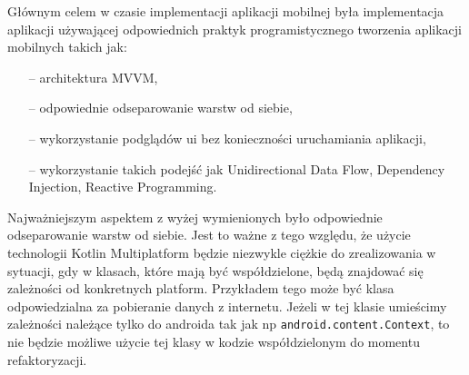 Głównym celem w czasie implementacji aplikacji mobilnej była implementacja aplikacji używającej odpowiednich praktyk programistycznego tworzenia aplikacji mobilnych takich jak:
\begin{itemize}
    \item[--] architektura MVVM,
    \item[--] odpowiednie odseparowanie warstw od siebie,
    \item[--] wykorzystanie podglądów ui bez konieczności uruchamiania aplikacji,
    \item[--] wykorzystanie takich podejść jak Unidirectional Data Flow, Dependency Injection, Reactive Programming.
\end{itemize}
Najważniejszym aspektem z wyżej wymienionych było odpowiednie odseparowanie warstw od siebie.
Jest to ważne z tego względu, że użycie technologii Kotlin Multiplatform będzie niezwykle ciężkie do zrealizowania w sytuacji, gdy w klasach, które mają być współdzielone, będą znajdować się zależności od konkretnych platform.
Przykładem tego może być klasa odpowiedzialna za pobieranie danych z internetu.
Jeżeli w tej klasie umieścimy zależności należące tylko do androida tak jak np \texttt{android.content.Context}, to nie będzie możliwe użycie tej klasy w kodzie współdzielonym do momentu refaktoryzacji.
